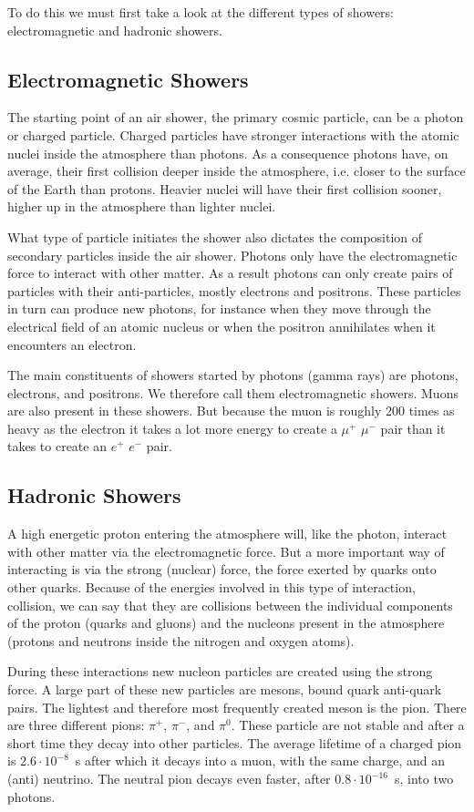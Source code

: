 \documentclass[12pt,a4paper]{article}
\numberwithin{equation}{section}
\numberwithin{figure}{section}
\numberwithin{table}{section}
\begin{document}
To do this we must first take a look at the different types of showers: electromagnetic and hadronic showers.

\subsection{Electromagnetic Showers}
The starting point of an air shower, the primary cosmic particle, can be a photon or charged particle. Charged particles have stronger interactions with the atomic nuclei inside the atmosphere than photons. As a consequence photons have, on average, their first collision deeper inside the atmosphere, i.e. closer to the surface of the Earth than protons. Heavier nuclei will have their first collision sooner, higher up in the atmosphere than lighter nuclei.

What type of particle initiates the shower also dictates the composition of secondary particles inside the air shower. Photons only have the electromagnetic force to interact with other matter. As a result photons can only create pairs of particles with their anti-particles, mostly electrons and positrons. These particles in turn can produce new photons, for instance when they move through the electrical field of an atomic nucleus or when the positron annihilates when it encounters an electron.

The main constituents of showers started by photons (gamma rays) are photons, electrons, and positrons. We therefore call them electromagnetic showers. Muons are also present in these showers. But because the muon is roughly 200 times as heavy as the electron it takes a lot more energy to create a $\mu^+$ $\mu^-$ pair than it takes to create an $e^+$ $e^-$ pair.

\subsection{Hadronic Showers}
A high energetic proton entering the atmosphere will, like the photon, interact with other matter via the electromagnetic force. But a more important way of interacting is via the strong (nuclear) force, the force exerted by quarks onto other quarks. Because of the energies involved in this type of interaction, collision, we can say that they are collisions between the individual components of the proton (quarks and gluons) and the nucleons present in the atmosphere (protons and neutrons inside the nitrogen and oxygen atoms).

During these interactions new nucleon particles are created using the strong force. A large part of these new particles are mesons, bound quark anti-quark pairs. The lightest and therefore most frequently created meson is the pion. There are three different pions: $\pi^+$, $\pi^-$, and $\pi^0$. These particle are not stable and after a short time they decay into other particles. The average lifetime of a charged pion is $2.6 \cdot 10^{-8}$~s after which it decays into a muon, with the same charge, and an (anti) neutrino. The neutral pion decays even faster, after $0.8 \cdot 10^{-16}$~s, into two photons.
\end{document}
